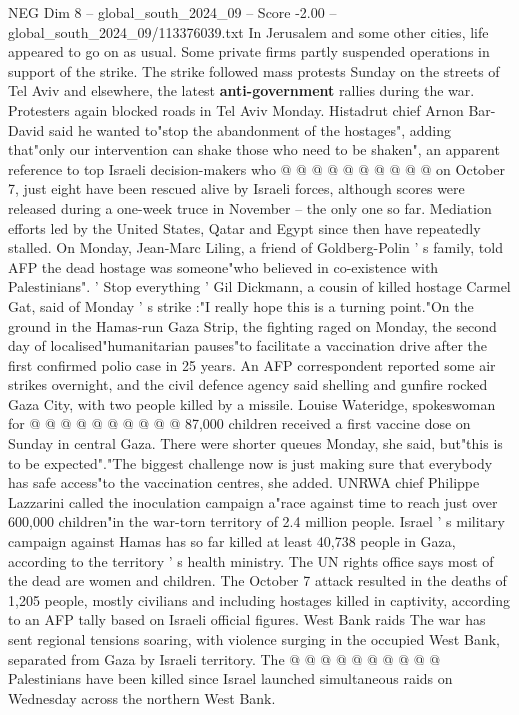 \begin{textsample}{NEG Dim 8 – global\_south\_2024\_09 – Score -2.00 – global\_south\_2024\_09/113376039.txt}
In Jerusalem and some other cities, life appeared to go on as usual.
Some private firms partly suspended operations in support of the strike.
The strike followed mass protests Sunday on the streets of Tel Aviv and elsewhere, the latest \textbf{anti-government} rallies during the war.
Protesters again blocked roads in Tel Aviv Monday.
Histadrut chief Arnon Bar-David said he wanted to"stop the abandonment of the hostages", adding that"only our intervention can shake those who need to be shaken", an apparent reference to top Israeli decision-makers who @ @ @ @ @ @ @ @ @ @ on October 7, just eight have been rescued alive by Israeli forces, although scores were released during a one-week truce in November -- the only one so far.
Mediation efforts led by the United States, Qatar and Egypt since then have repeatedly stalled.
On Monday, Jean-Marc Liling, a friend of Goldberg-Polin ' s family, told AFP the dead hostage was someone"who believed in co-existence with Palestinians". ' Stop everything ' Gil Dickmann, a cousin of killed hostage Carmel Gat, said of Monday ' s strike :"I really hope this is a turning point."On the ground in the Hamas-run Gaza Strip, the fighting raged on Monday, the second day of localised"humanitarian pauses"to facilitate a vaccination drive after the first confirmed polio case in 25 years.
An AFP correspondent reported some air strikes overnight, and the civil defence agency said shelling and gunfire rocked Gaza City, with two people killed by a missile.
Louise Wateridge, spokeswoman for @ @ @ @ @ @ @ @ @ @ 87,000 children received a first vaccine dose on Sunday in central Gaza.
There were shorter queues Monday, she said, but"this is to be expected"."The biggest challenge now is just making sure that everybody has safe access"to the vaccination centres, she added.
UNRWA chief Philippe Lazzarini called the inoculation campaign a"race against time to reach just over 600,000 children"in the war-torn territory of 2.4 million people.
Israel ' s military campaign against Hamas has so far killed at least 40,738 people in Gaza, according to the territory ' s health ministry.
The UN rights office says most of the dead are women and children.
The October 7 attack resulted in the deaths of 1,205 people, mostly civilians and including hostages killed in captivity, according to an AFP tally based on Israeli official figures.
West Bank raids The war has sent regional tensions soaring, with violence surging in the occupied West Bank, separated from Gaza by Israeli territory.
The @ @ @ @ @ @ @ @ @ @ Palestinians have been killed since Israel launched simultaneous raids on Wednesday across the northern West Bank.

\end{textsample}
